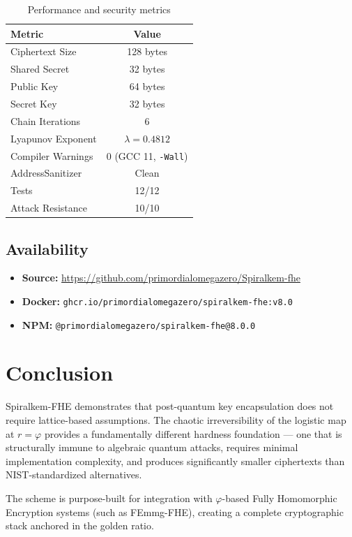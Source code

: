 \documentclass{article}
\begin{document}
\begin{table}[H]
\centering
\begin{tabular}{|l|c|}
\hline
\textbf{Metric} & \textbf{Value} \\
\hline
Ciphertext Size & 128 bytes \\
Shared Secret & 32 bytes \\
Public Key & 64 bytes \\
Secret Key & 32 bytes \\
Chain Iterations & 6 \\
Lyapunov Exponent & $\lambda = 0.4812$ \\
Compiler Warnings & 0 (GCC 11, \texttt{-Wall}) \\
AddressSanitizer & Clean \\
Tests & 12/12 \\
Attack Resistance & 10/10 \\
\hline
\end{tabular}
\caption{Performance and security metrics}
\end{table}

\subsection{Availability}

\begin{itemize}
    \item \textbf{Source:} \url{https://github.com/primordialomegazero/Spiralkem-fhe}
    \item \textbf{Docker:} \texttt{ghcr.io/primordialomegazero/spiralkem-fhe:v8.0}
    \item \textbf{NPM:} \texttt{@primordialomegazero/spiralkem-fhe@8.0.0}
\end{itemize}

\section{Conclusion}

Spiralkem-FHE demonstrates that post-quantum key encapsulation does not require lattice-based assumptions. The chaotic irreversibility of the logistic map at $r = \varphi$ provides a fundamentally different hardness foundation — one that is structurally immune to algebraic quantum attacks, requires minimal implementation complexity, and produces significantly smaller ciphertexts than NIST-standardized alternatives.

The scheme is purpose-built for integration with $\varphi$-based Fully Homomorphic Encryption systems (such as FEmmg-FHE), creating a complete cryptographic stack anchored in the golden ratio.
\end{document}
